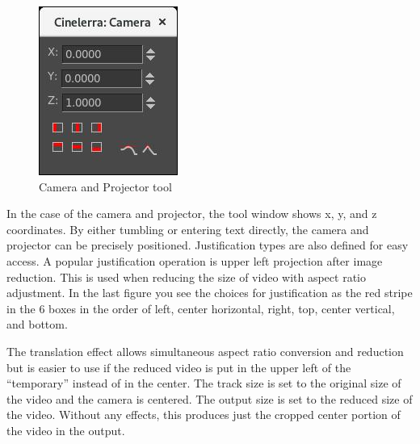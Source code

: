 \begin{figure} 
	\vspace{-4ex}
    \includegraphics[width=0.9\linewidth]{images/camera_tool.png}
    \caption{Camera and Projector tool}
    \label{fig:images/camera_tool}
\end{figure}

In the case of the camera and projector, the tool window shows x, y, and z coordinates. 
By either tumbling or entering text directly, the camera and projector can be precisely positioned.  
Justification types are also defined for easy access. 
A popular justification operation is upper left projection after image reduction. 
This is used when reducing the size of video with aspect ratio adjustment.  
In the last figure you see the choices for justification as the red stripe in the 6 boxes in the order of left, center horizontal, right, top, center vertical, and bottom.

The translation effect allows simultaneous aspect ratio conversion and reduction but is easier to use if the reduced video is put in the upper left of the “temporary” instead of in the center. 
The track size is set to the original size of the video and the camera is centered. 
The output size is set to the reduced size of the video. 
Without any effects, this produces just the cropped center portion of the video in the output.

